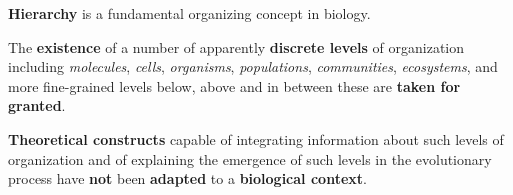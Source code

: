 \begin{frame}
\begin{block}{}
\textbf{Hierarchy} is a fundamental organizing concept in biology. 
\end{block}
\begin{block}{}
The \textbf{existence} of a number of apparently \textbf{discrete levels} of organization including {\it molecules}, {\it cells}, {\it organisms}, {\it populations}, {\it communities}, {\it ecosystems}, and more fine-grained levels below, above and in between these are \textbf{taken for granted}. 
\end{block}
\begin{block}{}
\textbf{Theoretical constructs} capable of integrating information about such levels of organization and of explaining the emergence of such levels in the evolutionary process have \textbf{not} been \textbf{adapted} to a \textbf{biological context}.
\end{block}
\end{frame}
